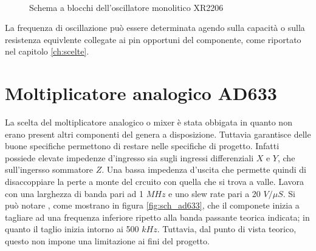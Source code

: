 \documentclass[titlepage]{report}
\begin{document}
	\begin{figure}[h]
		\centering
		 \qquad
		 \\
		\caption{Schema a blocchi dell'oscillatore monolitico XR2206}
		\label{fig:sch_xr2206}
	\end{figure}

	La frequenza di oscillazione può essere determinata agendo sulla capacità o sulla resistenza equivlente collegate ai pin opportuni del componente, come riportato nel capitolo \ref{ch:scelte}.
	
	
\section{Moltiplicatore analogico AD633}
	\label{sec:AD633}
	La scelta del moltiplicatore analogico o mixer è stata obbigata in quanto non erano present altri componenti del genera a disposizione.
	Tuttavia garantisce delle buone specifiche permettono di restare nelle specifiche di progetto.
	Infatti possiede elevate impedenze d'ingresso sia sugli ingressi differenziali $X$ e $Y$, che sull'ingersso sommatore $Z$. Una bassa impedenza d'uscita che permette quindi di disaccoppiare la perte a monte del crcuito con quella che si trova a valle. Lavora con una larghezza di banda pari ad 1 $MHz$ e uno slew rate pari a 20 $V/\mu S$. 
	Si può notare , come mostrano in figura \ref{fig:sch_ad633}, che il componete inizia a tagliare ad una frequenza inferiore ripetto alla banda passante teorica indicata; in quanto il taglio inizia intorno ai 500 $kHz$.
	Tuttavia, dal punto di vista teorico, questo non impone una limitazione ai fini del progetto.
\end{document}
